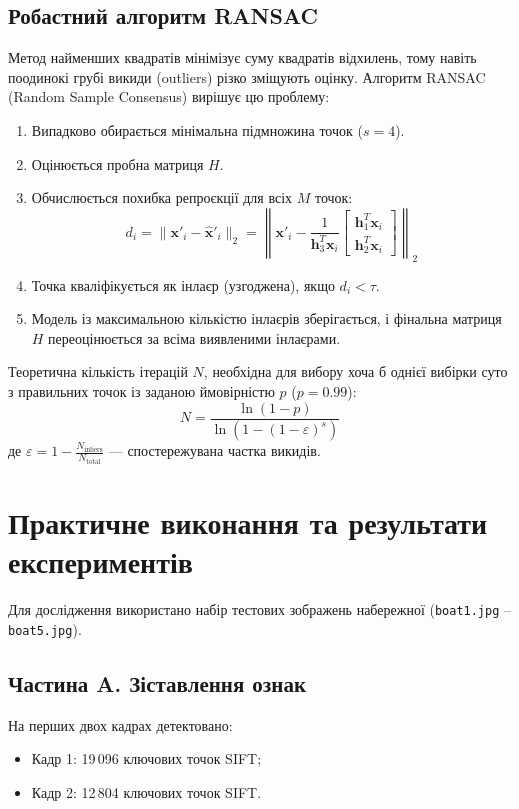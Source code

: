 \documentclass[12pt, a4paper]{article}
\begin{document}
	\subsection{Робастний алгоритм RANSAC}
	Метод найменших квадратів мінімізує суму квадратів відхилень, тому навіть поодинокі грубі викиди (outliers) різко зміщують оцінку. Алгоритм RANSAC (Random Sample Consensus) вирішує цю проблему:
	\begin{enumerate}
		\item Випадково обирається мінімальна підмножина точок ($s = 4$).
		\item Оцінюється пробна матриця $H$.
		\item Обчислюється похибка репроєкції для всіх $M$ точок:
		\begin{equation}
			d_i = \|\mathbf{x}'_i - \hat{\mathbf{x}}'_i\|_2 = \left\| \mathbf{x}'_i - \frac{1}{\mathbf{h}_3^T \mathbf{x}_i} \begin{bmatrix} \mathbf{h}_1^T \mathbf{x}_i \\ \mathbf{h}_2^T \mathbf{x}_i \end{bmatrix} \right\|_2
		\end{equation}
		\item Точка кваліфікується як інлаєр (узгоджена), якщо $d_i < \tau$.
		\item Модель із максимальною кількістю інлаєрів зберігається, і фінальна матриця $H$ переоцінюється за всіма виявленими інлаєрами.
	\end{enumerate}
	
	Теоретична кількість ітерацій $N$, необхідна для вибору хоча б однієї вибірки суто з правильних точок із заданою ймовірністю $p$ ($p=0.99$):
	\begin{equation}
		N = \frac{\ln(1 - p)}{\ln(1 - (1 - \varepsilon)^s)}
	\end{equation}
	де $\varepsilon = 1 - \frac{N_{\text{inliers}}}{N_{\text{total}}}$ --- спостережувана частка викидів.
	
	\section{Практичне виконання та результати експериментів}
	
	Для дослідження використано набір тестових зображень набережної (\texttt{boat1.jpg} -- \texttt{boat5.jpg}).
	
	\subsection{Частина A. Зіставлення ознак}
	На перших двох кадрах детектовано:
	\begin{itemize}
		\item Кадр 1: 19\,096 ключових точок SIFT;
		\item Кадр 2: 12\,804 ключових точок SIFT.
	\end{itemize}
	
\end{document}
